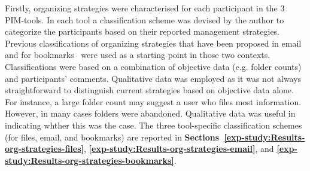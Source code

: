 Firstly, organizing strategies were characterised for each participant in the 3 PIM-tools.
In each tool a classification scheme was devised by the author to categorize the participants based on their reported management strategies.  Previous classifications of organizing strategies that have been proposed in email~\citep{Whittaker-email:96} and for bookmarks~\citep{da:98} were used as a starting point in those two contexts.  Classifications were based on a combination of objective data (e.g. folder counts) and participants' comments.  Qualitative data was employed as it was not always straightforward to distinguish current strategies based on objective data alone.  For instance, a large folder count may suggest a user who files most information.  However, in many cases folders were abandoned.  Qualitative data was useful in indicating whther this was the case.
The three tool-specific classification schemes (for files, email, and bookmarks) are reported in \textbf{Sections~\ref{exp-study:Results-org-strategies-files}}, \textbf{\ref{exp-study:Results-org-strategies-email}}, and \textbf{\ref{exp-study:Results-org-strategies-bookmarks}}.

